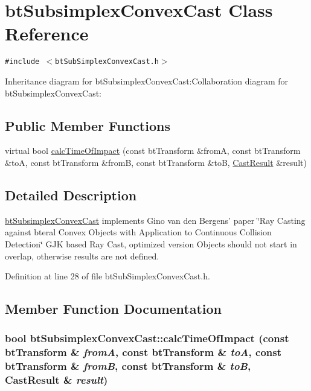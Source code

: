 \hypertarget{classbt_subsimplex_convex_cast}{
\section{btSubsimplexConvexCast Class Reference}
\label{classbt_subsimplex_convex_cast}
}
{\tt \#include $<$btSubSimplexConvexCast.h$>$}

Inheritance diagram for btSubsimplexConvexCast:Collaboration diagram for btSubsimplexConvexCast:\subsection*{Public Member Functions}
\begin{CompactItemize}
\item 
virtual bool \hyperlink{classbt_subsimplex_convex_cast_93202199b82c9d2f3074617f8db72e17}{calcTimeOfImpact} (const btTransform \&fromA, const btTransform \&toA, const btTransform \&fromB, const btTransform \&toB, \hyperlink{structbt_convex_cast_1_1_cast_result}{CastResult} \&result)
\end{CompactItemize}


\subsection{Detailed Description}
\hyperlink{classbt_subsimplex_convex_cast}{btSubsimplexConvexCast} implements Gino van den Bergens' paper \char`\"{}Ray Casting against bteral Convex Objects with Application to Continuous Collision Detection\char`\"{} GJK based Ray Cast, optimized version Objects should not start in overlap, otherwise results are not defined. 

Definition at line 28 of file btSubSimplexConvexCast.h.

\subsection{Member Function Documentation}
\hypertarget{classbt_subsimplex_convex_cast_93202199b82c9d2f3074617f8db72e17}{
\subsubsection[calcTimeOfImpact]{\setlength{\rightskip}{0pt plus 5cm}bool btSubsimplexConvexCast::calcTimeOfImpact (const btTransform \& {\em fromA}, \/  const btTransform \& {\em toA}, \/  const btTransform \& {\em fromB}, \/  const btTransform \& {\em toB}, \/  {\bf CastResult} \& {\em result})}}
\label{classbt_subsimplex_convex_cast_93202199b82c9d2f3074617f8db72e17}


